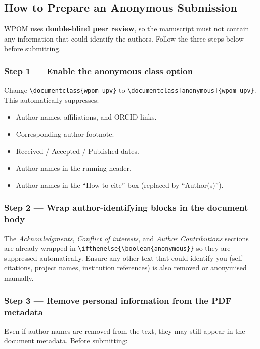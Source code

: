 \documentclass{wpom-upv}
\begin{document}
\subsection{How to Prepare an Anonymous Submission}

WPOM uses \textbf{double-blind peer review}, so the manuscript must not
contain any information that could identify the authors. Follow the
three steps below before submitting.

\subsubsection{Step 1 — Enable the anonymous class option}

Change \verb|\documentclass{wpom-upv}| to
\verb|\documentclass[anonymous]{wpom-upv}|.
This automatically suppresses:

\begin{itemize}
  \item Author names, affiliations, and ORCID links.
  \item Corresponding author footnote.
  \item Received / Accepted / Published dates.
  \item Author names in the running header.
  \item Author names in the ``How to cite'' box (replaced by ``Author(s)'').
\end{itemize}

\subsubsection{Step 2 — Wrap author-identifying blocks in the document body}

The \textit{Acknowledgments}, \textit{Conflict of interests}, and
\textit{Author Contributions} sections are already wrapped in
\verb|\ifthenelse{\boolean{anonymous}}| so they are suppressed
automatically. Ensure any other text that could identify you
(self-citations, project names, institution references) is also removed
or anonymised manually.

\subsubsection{Step 3 — Remove personal information from the PDF metadata}

Even if author names are removed from the text, they may still appear
in the document metadata. Before submitting:
\end{document}
